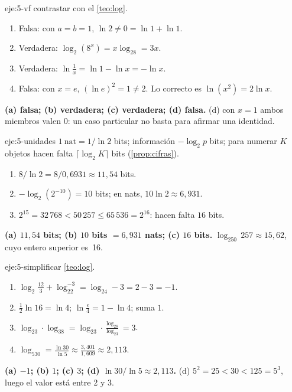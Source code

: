 \begin{solucion}{eje:5-vf}
\planteamiento contrastar con el \cref{teo:log}.
\pasos
\begin{enumerate}[label=(\alph*)]
  \item Falsa: con $a=b=1$, $\ln2\neq0=\ln1+\ln1$.
  \item Verdadera: $\log_2(8^x)=x\log_28=3x$.
  \item Verdadera: $\ln\frac1x=\ln1-\ln x=-\ln x$.
  \item Falsa: con $x=e$, $(\ln e)^2=1\neq2$. Lo correcto es $\ln(x^2)=2\ln x$.
\end{enumerate}
\resultado \textbf{(a) falsa; (b) verdadera; (c) verdadera; (d) falsa.}
\comprobacion (d) con $x=1$ ambos miembros valen 0: un caso particular no basta para afirmar una identidad.
\end{solucion}

\begin{solucion}{eje:5-unidades}
\planteamiento $1\ \text{nat}=1/\ln2$ bits; información $-\log_2p$ bits; para numerar $K$ objetos hacen falta $\lceil\log_2K\rceil$ bits (\cref{prop:cifras}).
\pasos
\begin{enumerate}[label=(\alph*)]
  \item $8/\ln2=8/0{,}6931\approx11{,}54$ bits.
  \item $-\log_2(2^{-10})=10$ bits; en nats, $10\ln2\approx6{,}931$.
  \item $2^{15}=32\,768<50\,257\le65\,536=2^{16}$: hacen falta $16$ bits.
\end{enumerate}
\resultado \textbf{(a) $11{,}54$ bits; (b) $10$ bits $=6{,}931$ nats; (c) $16$ bits.}
\comprobacion $\log_250\,257\approx15{,}62$, cuyo entero superior es~16.
\end{solucion}

\begin{solucion}{eje:5-simplificar}
\planteamiento \cref{teo:log}.
\pasos
\begin{enumerate}[label=(\alph*)]
  \item $\log_2\frac{12}3+\log_22^{-3}=\log_24-3=2-3=-1$.
  \item $\frac12\ln16=\ln4$; $\ln\frac e4=1-\ln4$; suma $1$.
  \item $\log_23\cdot\log_38=\log_23\cdot\frac{\log_28}{\log_23}=3$.
  \item $\log_530=\frac{\ln30}{\ln5}\approx\frac{3{,}401}{1{,}609}\approx2{,}113$.
\end{enumerate}
\resultado \textbf{(a) $-1$; (b) $1$; (c) $3$; (d) $\ln30/\ln5\approx2{,}113$.}
\comprobacion (d) $5^2=25<30<125=5^3$, luego el valor está entre 2 y 3.
\end{solucion}

